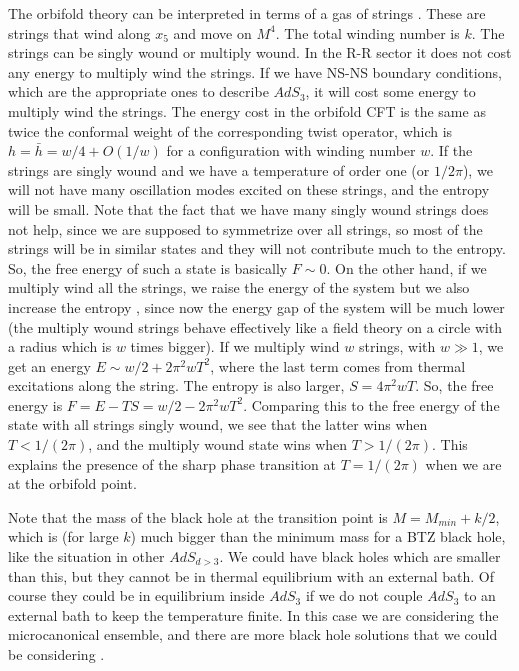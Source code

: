 The orbifold theory can be interpreted  
in terms of a gas of strings \cite{Dijkgraaf:1996xw,Dijkgraaf:1997cv}.
These are strings that wind along $x_5$  and move on $M^4$. The total
winding number is $k$. The strings can be singly wound or 
multiply wound. 
In the R-R sector it does not cost any energy to multiply wind the 
strings. 
 If we have NS-NS boundary conditions, which are the appropriate
ones to describe $AdS_3$, 
it will cost some energy to multiply wind the strings. 
The energy cost in the orbifold CFT
is the same as twice the  conformal weight of the 
corresponding twist operator, which is $ h = \bar h = w/4  + O(1/w)$
for a configuration with winding number $w$. 
 If the strings are singly wound and we have a temperature
of order one (or $1/2\pi$), we will not have
many oscillation modes excited on these strings, and the 
entropy will be small. Note that the fact that we have many singly
wound strings
does not help, since we are supposed to symmetrize over all strings,
so most of the strings will be in similar states and they will not
contribute much to the entropy. 
So, the free energy of such a state is basically $F \sim 0  $. 
On the other hand, if we multiply wind all the strings, we raise the 
energy of the system but we also increase the entropy 
\cite{Maldacena:1996ds}, since now the energy gap of the system
will be much lower (the multiply wound strings behave effectively like
a field theory on a circle with a radius which is $w$ times bigger).  
If we multiply 
wind $w$ strings, with $w \gg 1 $, 
 we get an energy $E \sim w/2 + 2 \pi^2 w T^2 $, where
the last term comes from thermal excitations along the string.
The entropy is also  larger, $ S = 4 \pi^2 w T $. 
So, the free energy is $F = E-TS=  w/2 -  2 \pi^2 w T^2 $. Comparing this
to the free energy of the state with all strings singly wound,
we see that the latter  wins when
$T<1/(2\pi)$, and the multiply wound state wins when $T>1/(2 \pi) $.
 This explains the presence of the sharp phase
transition at $T = 1/(2 \pi)$ when we are at  the orbifold point. 

Note that the mass of the black hole at the transition point
is $M = M_{min} + k/2 $, which is (for large $k$) much bigger 
than the minimum mass for a BTZ black hole, like the situation in
other $AdS_{d>3}$. 
We could have black holes which are smaller than this, but they 
cannot be in thermal equilibrium with an external bath.
Of course they could be in equilibrium inside $AdS_3$ if we
do not couple $AdS_3$ to an external bath to keep the temperature
finite. In this case we are considering the microcanonical ensemble,
and there are more black hole solutions that we could be 
considering \cite{Banks:1998dd,Li:1999jy,Martinec:1999ja}. 

